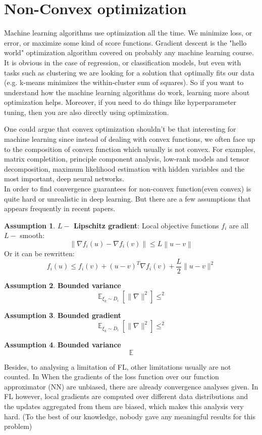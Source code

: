 \documentclass{article}
\DeclareMathOperator{\E}{\mathbb{E}}
\theoremstyle{theorem}
\theoremstyle{definition}
\newtheorem{assumption}{Assumption}
\begin{document}
	\section{Non-Convex optimization}
Machine learning algorithms use optimization all the time. We minimize loss, or error, or maximize some kind of score functions. Gradient descent is the "hello world" optimization algorithm covered on probably any machine learning course. It is obvious in the case of regression, or classification models, but even with tasks such as clustering we are looking for a solution that optimally fits our data (e.g. k-means minimizes the within-cluster sum of squares). So if you want to understand how the machine learning algorithms do work, learning more about optimization helps. Moreover, if you need to do things like hyperparameter tuning, then you are also directly using optimization.

One could argue that convex optimization shouldn't be that interesting for machine learning since instead of dealing with convex functions, we often face up to the composition of convex function which usually is not convex. For examples, matrix completition, principle component analysis, low-rank models and tensor decomposition, maximum likelihood estimation with hidden variables and the most important, deep neural networks.\\
In order to find convergence guarantees for non-convex function(even convex) is quite hard or unrealistic in deep learning. But there are a few assumptions that appears frequently in recent papers.
	\begin{assumption}
		\textbf{$L-$ Lipschitz gradient}: Local objective functions $f_i$ are all $L-$ smooth: $$\left\|\nabla f_i(u)-\nabla f_i(v) \right\| \leq L \left \| u-v \right\|$$
		Or it can be rewritten: $$f_i(u) \le f_i(v)+(u-v)^{T} \nabla f_i(v)+\frac{L}{2} \|u-v\|^2$$
	\end{assumption}
	\begin{assumption}
		\textbf{Bounded variance} $$\E _{\xi_k \sim D_i} \left[\| \nabla \| ^2\right] \le ^2 $$
	\end{assumption}
\begin{assumption}
	\textbf{Bounded gradient} $$\E _{\xi_k \sim D_i} \left[\| \nabla \| ^2\right] \le ^2 $$
\end{assumption}
\begin{assumption}
	\textbf{Bounded variance} $$\E  $$
\end{assumption}
Besides, to analysing a limitation of FL, other limitations usually are not counted. In \cite{}When the gradients of the loss function over our function approximator (NN) are unbiased, there are already convergence analyses given. In FL however, local gradients are computed over different data distributions and the updates aggregated from them are biased, which makes this analysis very hard. (To the best of our knowledge, nobody gave any meaningful results for this problem)
 
\end{document}
